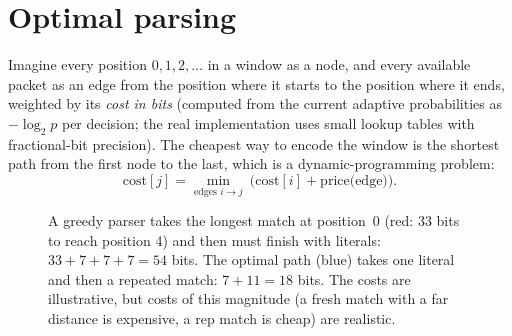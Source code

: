 \documentclass[11pt,a4paper,oneside]{book}
\begin{document}
\section{Optimal parsing}

Imagine every position $0,1,2,\dots$ in a window as a node, and every available packet as an edge from the position where it starts to the position where it ends, weighted by its
\emph{cost in bits} (computed from the current adaptive probabilities as $-\log_2 p$ per decision; the real implementation uses small lookup tables with fractional-bit precision).
The cheapest way to encode the window is the shortest path from the first node to the last, which is a dynamic-programming problem:
\[
\text{cost}[j]=\min_{\text{edges } i\to j}\ \big(\text{cost}[i]+\text{price(edge)}\big).
\]

\begin{figure}[ht]
\centering
{}
\caption{A greedy parser takes the longest match at position~0 (red: 33 bits to reach position 4) and then must finish with literals:
$33+7+7+7=54$ bits. The optimal path (blue) takes one literal and then a repeated match: $7+11=18$ bits. The costs are illustrative, but costs of this magnitude (a fresh match with a far
distance is expensive, a rep match is cheap) are realistic.}
\label{fig:optimal}
\end{figure}
\end{document}
